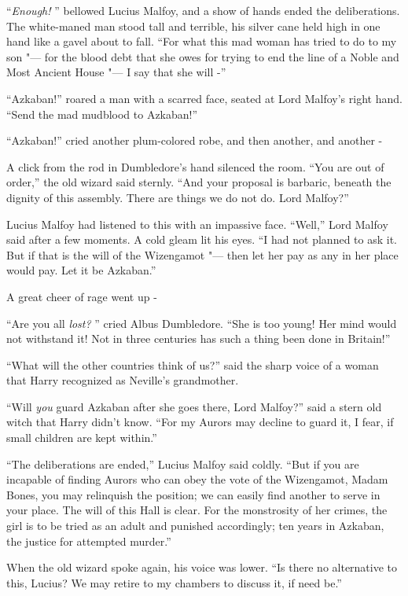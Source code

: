 ``\emph{Enough!} '' bellowed Lucius Malfoy, and a show of hands ended the
deliberations. The white-maned man stood tall and terrible, his silver
cane held high in one hand like a gavel about to fall. ``For what this
mad woman has tried to do to my son "--- for the blood debt that she owes
for trying to end the line of a Noble and Most Ancient House "--- I say
that she will -''

``Azkaban!'' roared a man with a scarred face, seated at Lord Malfoy's
right hand. ``Send the mad mudblood to Azkaban!''

``Azkaban!'' cried another plum-colored robe, and then another, and
another -

A click from the rod in Dumbledore's hand silenced the room. ``You are
out of order,'' the old wizard said sternly. ``And your proposal is
barbaric, beneath the dignity of this assembly. There are things we do
not do. Lord Malfoy?''

Lucius Malfoy had listened to this with an impassive face. ``Well,''
Lord Malfoy said after a few moments. A cold gleam lit his eyes. ``I had
not planned to ask it. But if that is the will of the Wizengamot "--- then
let her pay as any in her place would pay. Let it be Azkaban.''

A great cheer of rage went up -

``Are you all \emph{lost?} '' cried Albus Dumbledore. ``She is too young!
Her mind would not withstand it! Not in three centuries has such a thing
been done in Britain!''

``What will the other countries think of us?'' said the sharp voice of a
woman that Harry recognized as Neville's grandmother.

``Will \emph{you} guard Azkaban after she goes there, Lord Malfoy?'' said
a stern old witch that Harry didn't know. ``For my Aurors may decline to
guard it, I fear, if small children are kept within.''

``The deliberations are ended,'' Lucius Malfoy said coldly. ``But if you
are incapable of finding Aurors who can obey the vote of the Wizengamot,
Madam Bones, you may relinquish the position; we can easily find another
to serve in your place. The will of this Hall is clear. For the
monstrosity of her crimes, the girl is to be tried as an adult and
punished accordingly; ten years in Azkaban, the justice for attempted
murder.''

When the old wizard spoke again, his voice was lower. ``Is there no
alternative to this, Lucius? We may retire to my chambers to discuss it,
if need be.''

